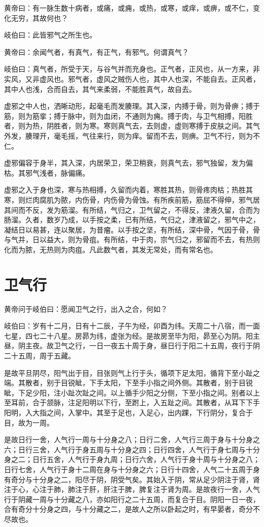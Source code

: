\documentclass[a4paper,12pt,UTF8,twoside]{ctexbook}
\begin{document}
	黄帝曰：有一脉生数十病者，或痛，或痈，或热，或寒，或痒，或痹，或不仁，变化无穷，其故何也？
	
	岐伯曰：此皆邪气之所生也。
	
	黄帝曰：余闻气者，有真气，有正气，有邪气。何谓真气？
	
	岐伯曰：真气者，所受于天，与谷气并而充身也。正气者，正风也，从一方来，非实风，又非虚风也。邪气者，虚风之贼伤人也，其中人也深，不能自去。正风者，其中人也浅，合而自去，其气来柔弱，不能胜真气，故自去。
	
	虚邪之中人也，洒晰动形，起毫毛而发腠理。其入深，内搏于骨，则为骨痹；搏于筋，则为筋挛；搏于脉中，则为血闭，不通则为痈。搏于肉，与卫气相搏，阳胜者，则为热，阴胜者，则为寒。寒则真气去，去则虚，虚则寒搏于皮肤之间。其气外发，腠理开，毫毛摇，气往来行，则为痒。留而不去，则痹。卫气不行，则为不仁。
	
	虚邪偏容于身半，其入深，内居荣卫，荣卫稍衰，则真气去，邪气独留，发为偏枯。其邪气浅者，脉偏痛。
	
	虚邪之入于身也深，寒与热相搏，久留而内着，寒胜其热，则骨疼肉枯；热胜其寒，则烂肉腐肌为脓，内伤骨，内伤骨为骨蚀。有所疾前筋，筋屈不得伸，邪气居其间而不反，发为筋溜。有所结，气归之，卫气留之，不得反，津液久留，合而为肠溜。久者，数岁乃成，以手按之柔，已有所结，气归之，津液留之，邪气中之，凝结日以易甚，连以聚居，为昔瘤。以手按之坚，有所结，深中骨，气因于骨，骨与气并，日以益大，则为骨疽。有所结，中于肉，宗气归之，邪留而不去，有热则化而为脓，无热则为肉疽。凡此数气者，其发无常处，而有常名也。
	
	\chapter{卫气行}
	
	黄帝问于岐伯曰：愿闻卫气之行，出入之合，何如？
	
	岐伯曰：岁有十二月，日有十二辰，子午为经，卯酉为纬。天周二十八宿，而一面七星，四七二十八星。房昴为纬，虚张为经。是故房至毕为阳，昴至心为阴。阳主昼，阴主夜。故卫气之行，一日一夜五十周于身，昼日行于阳二十五周，夜行于阴二十五周，周于五藏。
	
	是故平旦阴尽，阳气出于目，目张则气上行于头，循项下足太阳，循背下至小趾之端。其散者，别于目锐眦，下手太阳，下至手小指之间外侧。其散者，别于目锐眦，下足少阳，注小趾次趾之间。以上循手少阳之分侧，下至小指之间。别者以上至耳前，合于颔脉，注足阳明以下行，至跗上，入五趾之间。其散者，从耳下下手阳明，入大指之间，入掌中。其至于足也，入足心，出内踝，下行阴分，复合于目，故为一周。
	
	是故日行一舍，人气行一周与十分身之八；日行二舍，人气行三周于身与十分身之六；日行三舍，人气行于身五周与十分身之四；日行四舍，人气行于身七周与十分身之二；日行五舍，人气行于身九周；日行六舍，人气行于身十周与十分身之八；日行七舍，人气行于身十二周在身与十分身之六；日行十四舍，人气二十五周于身有奇分与十分身之二，阳尽于阴，阴受气矣。其始入于阴，常从足少阴注于肾，肾注于心，心注于肺，肺注于肝，肝注于脾，脾复注于肾为周。是故夜行一舍，人气行于阴藏一周与十分藏之八，亦如阳行之二十五周，而复合于目。阴阳一日一夜，合有奇分十分身之四，与十分藏之二，是故人之所以卧起之时，有早晏者，奇分不尽故也。
	
\end{document}
